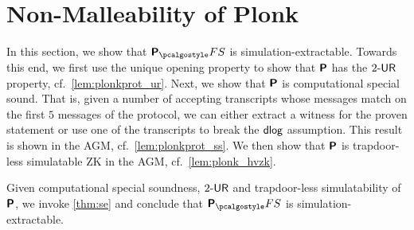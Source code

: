 

 


\section{Non-Malleability of Plonk} 
\label{sec:plonk}
In this section, we show that $\plonkprotfs$ is simulation-extractable. Towards this end, we first use the unique opening property to show that
$\bm{\mathsf{P}}$ has the ${2\text{-}\mathsf{UR}}$ property,
cf.~\cref{lem:plonkprot_ur}.
Next, we show that $\bm{\mathsf{P}}$ is computational special sound. That is, given a
number of accepting transcripts whose messages match on the first $5$ messages of the
protocol, we can either extract a witness for the proven statement or use
one of the transcripts to break the $\mathsf{dlog}$ assumption. This result is shown in
the AGM, cf.~\cref{lem:plonkprot_ss}. We then show that $\bm{\mathsf{P}}$ is trapdoor-less simulatable ZK in the AGM, cf.~\cref{lem:plonk_hvzk}.

Given computational special soundness, ${2\text{-}\mathsf{UR}}$ and trapdoor-less simulatability of $\bm{\mathsf{P}}$, we invoke \cref{thm:se} and conclude that $\plonkprot_\fs$ is simulation-extractable.

\newcommand{\vql}{\vec{q_{L}}}
\newcommand{\vqr}{\vec{q_{R}}}
\newcommand{\vqm}{\vec{q_{M}}}
\newcommand{\vqo}{\vec{q_{O}}}
\newcommand{\vx}{\vec{x}}
\newcommand{\vqc}{\vec{q_{C}}}

